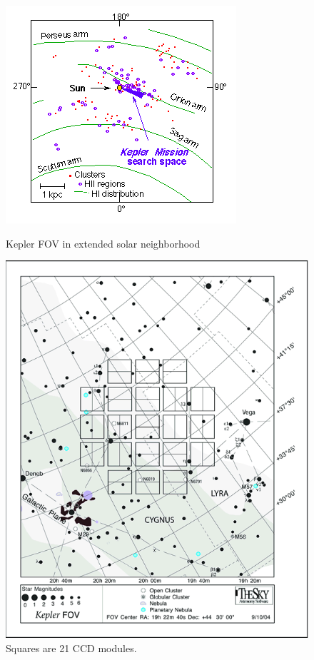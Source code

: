 \begin{figure}[!htb]
  \includegraphics[width=\linewidth]{img/FOV1.png}
  \caption{Kepler FOV in extended solar neighborhood}\label{fig:FOV1}
\endminipage\hfill
{}
  \includegraphics[width=\linewidth]{img/FOV3.png}
  \caption{Squares are 21 CCD modules.}\label{fig:FOV3}
\endminipage
\end{figure}

